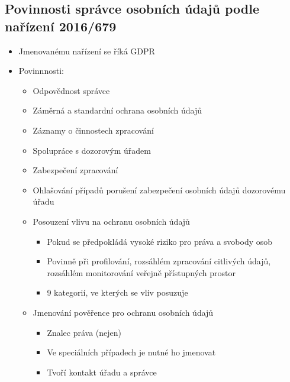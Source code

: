 \subsection{Povinnosti správce osobních údajů podle nařízení 2016/679}
\begin{itemize}
    \item Jmenovanému nařízení se říká GDPR
    \item Povinnnosti:
    \begin{itemize}
        \item Odpovědnost správce
        \item Záměrná a standardní ochrana osobních údajů
        \item Záznamy o činnostech zpracování
        \item Spolupráce s dozorovým úřadem
        \item Zabezpečení zpracování
        \item Ohlašování případů porušení zabezpečení osobních údajů dozorovému úřadu
        \item Posouzení vlivu na ochranu osobních údajů
        \begin{itemize}
            \item Pokud se předpokládá vysoké riziko pro práva a svobody osob
            \item Povinně při profilování, rozsáhlém zpracování citlivých údajů, rozsáhlém monitorování veřejně přístupných prostor
            \item 9 kategorií, ve kterých se vliv posuzuje
        \end{itemize}
        \item Jmenování pověřence pro ochranu osobních údajů
        \begin{itemize}
            \item Znalec práva (nejen)
            \item Ve speciálních případech je nutné ho jmenovat
            \item Tvoří kontakt úřadu a správce
        \end{itemize}
    \end{itemize}
\end{itemize}


